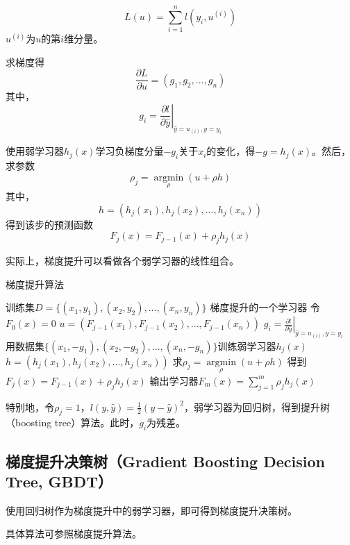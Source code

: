 \begin{equation}
	L(u)=\sum\limits_{i=1}^n l(y_i,u^{(i)})
\end{equation}
$u^{(i)}$为$u$的第$i$维分量。\par
	求梯度得
\begin{equation}
	\frac{\partial L}{\partial u}=(g_1,g_2,...,g_n)
\end{equation}
其中，
\begin{equation}
	g_i=\left.\frac{\partial l}{\partial\hat{y}}\right|_{\hat{y}=u_{(i)},y=y_i}
\end{equation}\par
	使用弱学习器$h_j(x)$学习负梯度分量$-g_i$关于$x_i$的变化，得$-g=h_j(x)$。然后，求参数
\begin{equation}
	\rho_j=\mathop{\arg\min}\limits_\rho (u+\rho h)
\end{equation}
其中，
\begin{equation}
	h=(h_j(x_1),h_j(x_2),...,h_j(x_n))
\end{equation}
得到该步的预测函数
\begin{equation}
	F_j(x)=F_{j-1}(x)+\rho_j h_j(x)
\end{equation}\par
	实际上，梯度提升可以看做各个弱学习器的线性组合。\par
\begin{algorithm}
\caption{梯度提升算法}
\begin{algorithmic}[1]
\Require 训练集$D=\{(x_1,y_1),(x_2,y_2),...,(x_n,y_n)\}$
\Ensure 梯度提升的一个学习器
	\State 令$F_0(x)=0$
		\State $u=(F_{j-1}(x_1),F_{j-1}(x_2),...,F_{j-1}(x_n))$
			\State $g_i=\left.\frac{\partial l}{\partial\hat{y}}\right|_{\hat{y}=u_{(i)},y=y_i}$
		\EndFor
		\State 用数据集$\{(x_1,-g_1),(x_2,-g_2),...,(x_n,-g_n)\}$训练弱学习器$h_j(x)$
		\State $h=(h_j(x_1),h_j(x_2),...,h_j(x_n))$
		\State 求$\rho_j=\mathop{\arg\min}\limits_\rho (u+\rho h)$
		\State 得到$F_j(x)=F_{j-1}(x)+\rho_j h_j(x)$
	\EndFor
	\State 输出学习器$F_m(x)=\sum\limits_{j=1}^m \rho_j h_j(x)$
\end{algorithmic}
\end{algorithm}
	特别地，令$\rho_j=1$，$l(y,\hat{y})=\frac{1}{2}(y-\hat{y})^2$，弱学习器为回归树，得到提升树（boosting tree）算法。此时，$g_i$为残差。\par
\subsection{梯度提升决策树（Gradient Boosting Decision Tree, GBDT）}
	使用回归树作为梯度提升中的弱学习器，即可得到梯度提升决策树。\par
	具体算法可参照梯度提升算法。\par
